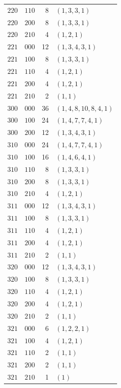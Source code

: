 \begin{longtable}{@{}ccrl@{}}
$220$ & $110$ & 8 & $(1,3,3,1)$ \\
$220$ & $200$ & 8 & $(1,3,3,1)$ \\
$220$ & $210$ & 4 & $(1,2,1)$ \\
$221$ & $000$ & 12 & $(1,3,4,3,1)$ \\
$221$ & $100$ & 8 & $(1,3,3,1)$ \\
$221$ & $110$ & 4 & $(1,2,1)$ \\
$221$ & $200$ & 4 & $(1,2,1)$ \\
$221$ & $210$ & 2 & $(1,1)$ \\
$300$ & $000$ & 36 & $(1,4,8,10,8,4,1)$ \\
$300$ & $100$ & 24 & $(1,4,7,7,4,1)$ \\
$300$ & $200$ & 12 & $(1,3,4,3,1)$ \\
$310$ & $000$ & 24 & $(1,4,7,7,4,1)$ \\
$310$ & $100$ & 16 & $(1,4,6,4,1)$ \\
$310$ & $110$ & 8 & $(1,3,3,1)$ \\
$310$ & $200$ & 8 & $(1,3,3,1)$ \\
$310$ & $210$ & 4 & $(1,2,1)$ \\
$311$ & $000$ & 12 & $(1,3,4,3,1)$ \\
$311$ & $100$ & 8 & $(1,3,3,1)$ \\
$311$ & $110$ & 4 & $(1,2,1)$ \\
$311$ & $200$ & 4 & $(1,2,1)$ \\
$311$ & $210$ & 2 & $(1,1)$ \\
$320$ & $000$ & 12 & $(1,3,4,3,1)$ \\
$320$ & $100$ & 8 & $(1,3,3,1)$ \\
$320$ & $110$ & 4 & $(1,2,1)$ \\
$320$ & $200$ & 4 & $(1,2,1)$ \\
$320$ & $210$ & 2 & $(1,1)$ \\
$321$ & $000$ & 6 & $(1,2,2,1)$ \\
$321$ & $100$ & 4 & $(1,2,1)$ \\
$321$ & $110$ & 2 & $(1,1)$ \\
$321$ & $200$ & 2 & $(1,1)$ \\
$321$ & $210$ & 1 & $(1)$ \\
\end{longtable}
\endgroup
